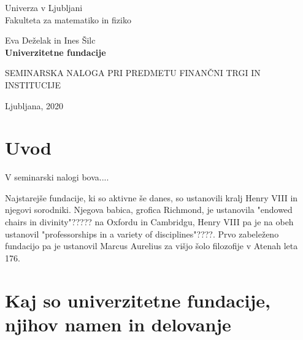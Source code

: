 \documentclass[12pt, a4paper]{article}
\begin{document}
\begin{titlepage}
\begin{center}

\large
Univerza v Ljubljani\\
\normalsize
Fakulteta za matematiko in fiziko\\

\vspace{3 cm} 

\large
Eva Deželak in Ines Šilc\\

\vspace{0.5cm}
\LARGE
\textbf{Univerzitetne fundacije}

\vspace{0.5 cm}
\normalsize


\vspace{1.5cm}
\normalsize
SEMINARSKA NALOGA PRI PREDMETU FINANČNI TRGI IN INSTITUCIJE

\vspace{3cm}


\vfill

\large Ljubljana, 2020

\end{center}
\end{titlepage}

\newpage

\tableofcontents

\newpage

\listoffigures

\newpage

\section{Uvod}

V seminarski nalogi bova....

Najstarejše fundacije, ki so aktivne še danes, so ustanovili kralj Henry VIII in njegovi sorodniki. Njegova babica, grofica Richmond, je ustanovila "endowed chairs in divinity"????? na Oxfordu in Cambridgu, Henry VIII pa je na obeh ustanovil "professorships in a variety of disciplines"????. Prvo zabeleženo fundacijo pa je ustanovil Marcus Aurelius za višjo šolo filozofije v Atenah leta 176. \cite{Investopedia}

\section{Kaj so univerzitetne fundacije, njihov namen in delovanje}
\end{document}

